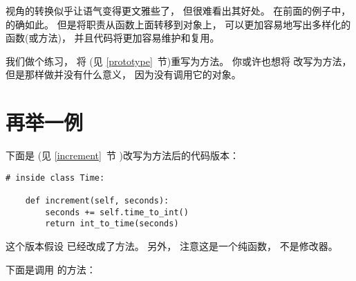 
视角的转换似乎让语气变得更文雅些了， 但很难看出其好处。
在前面的例子中， 的确如此。
但是将职责从函数上面转移到对象上， 可以更加容易地写出多样化的函数(或方法)，
并且代码将更加容易维护和复用。


我们做个练习， 将  (见 \ref{prototype}~节)重写为方法。
你或许也想将  改写为方法，  但是那样做并没有什么意义，  因为没有调用它的对象。

\section{再举一例}


下面是  (见 \ref{increment}~节 )改写为方法后的代码版本：

\begin{lstlisting}
# inside class Time:

    def increment(self, seconds):
        seconds += self.time_to_int()
        return int_to_time(seconds)
\end{lstlisting}

%

这个版本假设  已经改成了方法。    另外， 注意这是一个纯函数， 不是修改器。


下面是调用  的方法：

